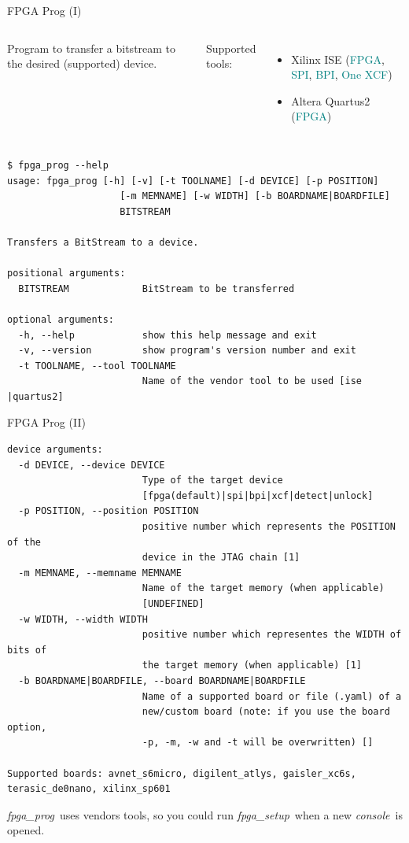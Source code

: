 \documentclass{beamer}
\newcommand{\fpgasetup}      {\textit{fpga\_setup}}
\newcommand{\fpgaprog}       {\textit{fpga\_prog}}
\newcommand{\console}        {\textit{console}}
\begin{document}
\begin{frame}[fragile]{FPGA Prog (I)}
  \begin{columns}
      \begin{block}{}
        \small
        Program to transfer a bitstream to the desired (supported) device.
      \end{block}{}
      \small Supported tools:
      \begin{itemize}
        \tiny
        \item Xilinx ISE (\textcolor{teal}{FPGA}, \textcolor{teal}{SPI}, \textcolor{teal}{BPI}, \textcolor{teal}{One XCF})
        \item Altera Quartus2 (\textcolor{teal}{FPGA})
      \end{itemize}
  \end{columns}
  \tiny
  \begin{verbatim}
$ fpga_prog --help
usage: fpga_prog [-h] [-v] [-t TOOLNAME] [-d DEVICE] [-p POSITION]
                    [-m MEMNAME] [-w WIDTH] [-b BOARDNAME|BOARDFILE]
                    BITSTREAM

Transfers a BitStream to a device.

positional arguments:
  BITSTREAM             BitStream to be transferred

optional arguments:
  -h, --help            show this help message and exit
  -v, --version         show program's version number and exit
  -t TOOLNAME, --tool TOOLNAME
                        Name of the vendor tool to be used [ise |quartus2]
  \end{verbatim}
\end{frame}

\begin{frame}[fragile]{FPGA Prog (II)}
  \tiny
  \begin{verbatim}
device arguments:
  -d DEVICE, --device DEVICE
                        Type of the target device
                        [fpga(default)|spi|bpi|xcf|detect|unlock]
  -p POSITION, --position POSITION
                        positive number which represents the POSITION of the
                        device in the JTAG chain [1]
  -m MEMNAME, --memname MEMNAME
                        Name of the target memory (when applicable)
                        [UNDEFINED]
  -w WIDTH, --width WIDTH
                        positive number which representes the WIDTH of bits of
                        the target memory (when applicable) [1]
  -b BOARDNAME|BOARDFILE, --board BOARDNAME|BOARDFILE
                        Name of a supported board or file (.yaml) of a
                        new/custom board (note: if you use the board option,
                        -p, -m, -w and -t will be overwritten) []

Supported boards: avnet_s6micro, digilent_atlys, gaisler_xc6s,
terasic_de0nano, xilinx_sp601
  \end{verbatim}
  \begin{alertblock}{}
    \small
    \fpgaprog\ uses vendors tools, so you could run \fpgasetup\ when a new
    \console\ is opened.
  \end{alertblock}
\end{frame}
\end{document}
